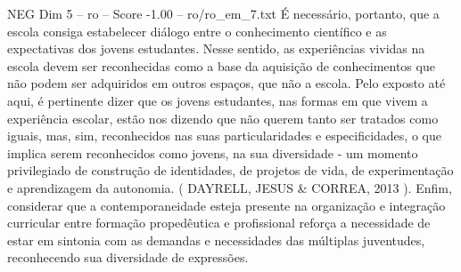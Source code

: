 \begin{textsample}{NEG Dim 5 – ro – Score -1.00 – ro/ro\_em\_7.txt}
É necessário, portanto, que a escola consiga estabelecer diálogo entre o conhecimento científico e as expectativas dos jovens estudantes.
Nesse sentido, as experiências vividas na escola devem ser reconhecidas como a base da aquisição de conhecimentos que não podem ser adquiridos em outros espaços, que não a escola.
Pelo exposto até aqui, é pertinente dizer que os jovens estudantes, nas formas em que vivem a experiência escolar, estão nos dizendo que não querem tanto ser tratados como iguais, mas, sim, reconhecidos nas suas particularidades e especificidades, o que implica serem reconhecidos como jovens, na sua diversidade - um momento privilegiado de construção de identidades, de projetos de vida, de experimentação e aprendizagem da autonomia. ( DAYRELL, JESUS \& CORREA, 2013 ).
Enfim, considerar que a contemporaneidade esteja presente na organização e integração curricular entre formação propedêutica e profissional reforça a necessidade de estar em sintonia com as demandas e necessidades das múltiplas juventudes, reconhecendo sua diversidade de expressões.

\end{textsample}
